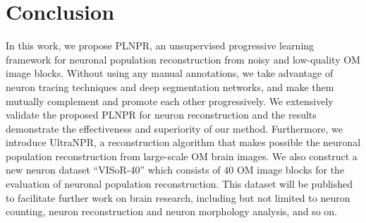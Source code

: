 \documentclass[times,twocolumn,final]{elsarticle}
\newcommand{\md}[1]{\textcolor[rgb]{0,0,1}{#1}}
\begin{document}





\section{Conclusion}
\label{sec:conclusion}
In this work, we propose PLNPR, an \md{unsupervised} progressive learning framework for neuronal population reconstruction from noisy and low-quality OM image blocks.
Without using any manual annotations, we take advantage of neuron tracing techniques and deep segmentation networks, and make them mutually complement and promote each other progressively.
We extensively validate the proposed PLNPR for neuron reconstruction and the results demonstrate the effectiveness and superiority of our method.
Furthermore, we introduce UltraNPR, a reconstruction algorithm that makes possible the neuronal population reconstruction from large-scale OM brain images.
We also construct a new neuron dataset ``VISoR-40'' which consists of $ 40 $ OM image blocks for the evaluation of neuronal population reconstruction.
This dataset will be published to facilitate further work on brain research, including but not limited to neuron counting, neuron reconstruction and neuron morphology analysis, and so on.


\end{document}
